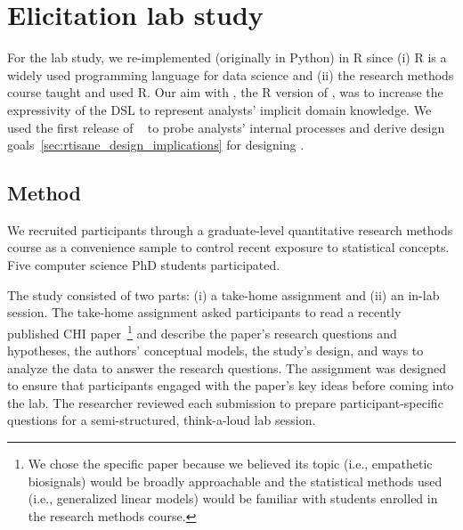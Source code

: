 \def\unit{\texttt{Unit}\xspace}
\def\measure{\texttt{Measure}\xspace}
\def\setup{\texttt{SetUp}\xspace}

\section{Elicitation lab study} \label{sec:exploratoryStudy}

For the lab study, we re-implemented \tisane (originally in Python) in R since
(i) R is a widely used programming language for data science and (ii) the
research methods course taught and used R. Our aim with \rTisane, the R version
of \tisane, was to increase the expressivity of the DSL to represent analysts'
implicit domain knowledge. We used the first release of
\tisane~\cite{jun2022tisane} to probe analysts' internal processes and derive
design goals~\autoref{sec:rtisane_design_implications} for designing \rTisane.

\subsection{Method}
We recruited participants through a graduate-level quantitative research methods
course as a convenience sample to control recent exposure to
statistical concepts. Five computer science PhD students participated.

The study consisted of two parts: (i) a take-home assignment and (ii) an in-lab
session. The take-home assignment asked participants to read a recently
published CHI paper~\cite{winters2021heartbeat}\footnote{We chose the specific
paper because we believed its topic (i.e., empathetic biosignals) would be
broadly approachable and the statistical methods used (i.e., generalized linear
models) would be familiar with students enrolled in the research methods
course.} and describe the paper's research questions and hypotheses, the
authors' conceptual models, the study's design, and ways to analyze the data to
answer the research questions. The assignment was designed to ensure that
participants engaged with the paper's key ideas before coming into the lab. The
researcher reviewed each submission to prepare participant-specific questions
for a semi-structured, think-a-loud lab session. 

